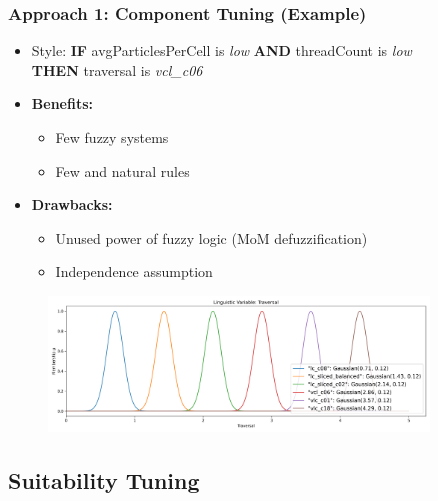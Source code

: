 \documentclass[
	10pt,
	t		%
]{beamer}
\begin{document}
\begin{frame}
	\frametitle{Approach 1: Component Tuning (Example)}
	\begin{itemize}
		\item Style: {\small \textbf{IF} avgParticlesPerCell is \textit{low} \textbf{AND} threadCount is \textit{low}\\ \qquad  \qquad \quad \textbf{THEN} traversal is \textit{vcl\_c06}}
		\item \textbf{Benefits:}
		      \begin{itemize}
			      \item Few fuzzy systems
			      \item Few and natural rules
		      \end{itemize}
		\item \textbf{Drawbacks:}
		      \begin{itemize}
			      \item Unused power of fuzzy logic (MoM defuzzification)
			      \item Independence assumption
		      \end{itemize}


	\end{itemize}

	\begin{figure}
		\centering
		\includegraphics[width=0.9\textwidth,trim={0 0 0 1cm},clip]
		{figures/component-linguistic-variable.png}
	\end{figure}

\end{frame}



\subsection{Suitability Tuning}
\end{document}
